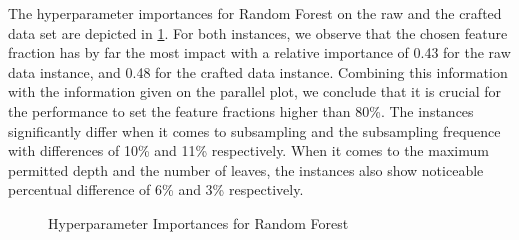 The hyperparameter importances for Random Forest on the raw and the crafted data set are depicted in \ref{fig:RF_Importances}. For both instances, we observe that the chosen feature fraction has by far the most impact with a relative importance of 0.43 for the raw data instance, and 0.48 for the crafted data instance. Combining this information with the information given on the parallel plot, we conclude that it is crucial for the performance to set the feature fractions higher than 80\%. The instances significantly differ when it comes to subsampling and the subsampling frequence with differences of 10\% and 11\% respectively. When it comes to the maximum permitted depth and the number of leaves, the instances also show noticeable percentual difference of 6\% and 3\% respectively.
\begin{figure}[h]
	\centering
	\caption{Hyperparameter Importances for Random Forest}
	\label{fig:RF_Importances}
\end{figure} 
